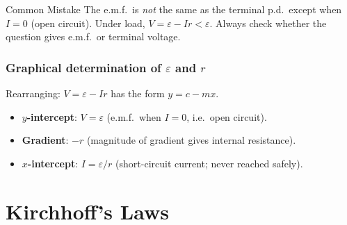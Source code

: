 \begin{warningbox}{Common Mistake}
The e.m.f.\ is \emph{not} the same as the terminal p.d.\ except when $I = 0$ (open circuit). Under load, $V = \varepsilon - Ir < \varepsilon$. Always check whether the question gives e.m.f.\ or terminal voltage.
\end{warningbox}

\subsubsection*{Graphical determination of $\varepsilon$ and $r$}

Rearranging: $V = \varepsilon - Ir$ has the form $y = c - mx$.

\begin{center}
\end{center}

\begin{itemize}[itemsep=2pt]
  \item \textbf{$y$-intercept}: $V = \varepsilon$ (e.m.f.\ when $I = 0$, i.e.\ open circuit).
  \item \textbf{Gradient}: $-r$ (magnitude of gradient gives internal resistance).
  \item \textbf{$x$-intercept}: $I = \varepsilon/r$ (short-circuit current; never reached safely).
\end{itemize}

\section{Kirchhoff's Laws}

\vspace{2em}

